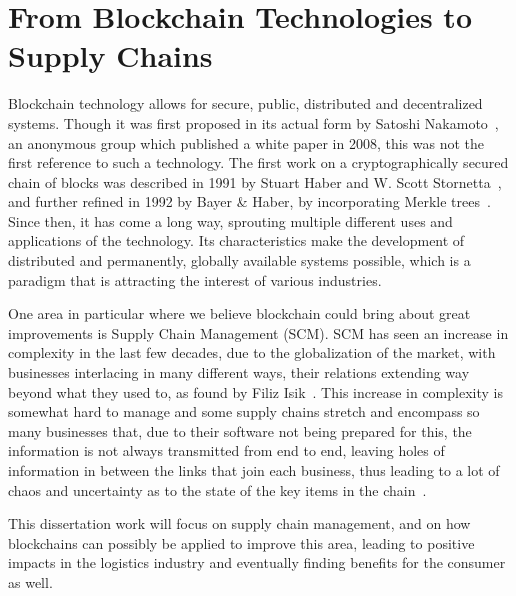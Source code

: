 \section{From Blockchain Technologies to Supply Chains} \label{sec:context}

Blockchain technology allows for secure, public, distributed and decentralized systems. Though it was first proposed in its actual form by Satoshi Nakamoto~\cite{Nakamoto2008}, an anonymous group which published a white paper in 2008, this was not the first reference to such a technology. The first work on a cryptographically secured chain of blocks was described in 1991 by Stuart Haber and W. Scott Stornetta~\cite{Haber1991}, and further refined in 1992 by Bayer \& Haber, by incorporating Merkle trees~\cite{Bayer1993}. Since then, it has come a long way, sprouting multiple different uses and applications of the technology. Its characteristics make the development of distributed and permanently, globally available systems possible, which is a paradigm that is attracting the interest of various industries.

One area in particular where we believe blockchain could bring about great improvements is Supply Chain Management (SCM). SCM has seen an increase in complexity in the last few decades, due to the globalization of the market, with businesses interlacing in many different ways, their relations extending way beyond what they used to, as found by Filiz Isik~\cite{Isik2011}. This increase in complexity is somewhat hard to manage and some supply chains stretch and encompass so many businesses that, due to their software not being prepared for this, the information is not always transmitted from end to end, leaving holes of information in between the links that join each business, thus leading to a lot of chaos and uncertainty as to the state of the key items in the chain~\cite{Wilding1998}.

   This dissertation work will focus on supply chain management, and on how blockchains can possibly be applied to improve this area, leading to positive impacts in the logistics industry and eventually finding benefits for the consumer as well. 



